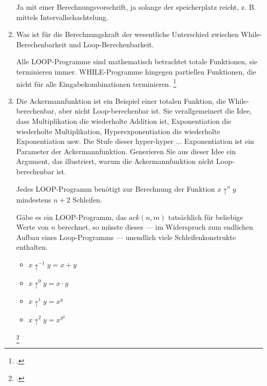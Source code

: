 \documentclass{bschlangaul-aufgabe}
\begin{document}
\begin{enumerate}
\begin{bAntwort}
Ja mit einer Berechnungsvorschrift, ja solange der speicherplatz reicht,
z. B. mittels Intervallschachtelung.
\end{bAntwort}


\item Was ist für die Berechnungskraft der wesentliche Unterschied
zwischen While-Berechenbarkeit und Loop-Berechenbarkeit.

\begin{bAntwort}
Alle LOOP-Programme sind mathematisch betrachtet totale Funktionen,
\dh sie terminieren immer. WHILE-Programme hingegen partiellen
Funktionen, die nicht für alle Eingabekombinationen terminieren.
\footcite[Seite 258-259]{hoffmann}
\end{bAntwort}



\item Die Ackermannfunktion ist ein Beispiel einer totalen Funktion, die
While-berechenbar, aber nicht Loop-berechenbar ist. Sie verallgemeinert
die Idee, dass Multiplikation die wiederholte Addition ist,
Exponentiation die wiederholte Multiplikation, Hyperexponentiation die
wiederholte Exponentiation usw. Die Stufe dieser hyper-hyper ...
Exponentiation ist ein Parameter der Ackermannfunktion. Generieren Sie
aus dieser Idee ein Argument, das illustriert, warum die
Ackermannfunktion nicht Loop-berechenbar ist.

\begin{bAntwort}
Jedes LOOP-Programm benötigt zur Berechnung der Funktion $x \uparrow^n
y$ mindestens $n + 2$ Schleifen.

Gäbe es ein LOOP-Programm, das $ack(n,
m)$ tatsächlich für beliebige Werte von $n$ berechnet, so müsste dieses
--- im Widerspruch zum endlichen Aufbau eines Loop-Programms ---
unendlich viele Schleifenkonstrukte enthalten.


\begin{itemize}
\item $x \uparrow^{-1} y = x + y$
\item $x \uparrow^0 y = x \cdot y$
\item $x \uparrow^1 y = x^y$
\item $x \uparrow^2 y = x^{y^y}$

\end{itemize}
\footcite[Seite 258]{hoffmann}
\end{bAntwort}


\end{enumerate}
\end{document}
